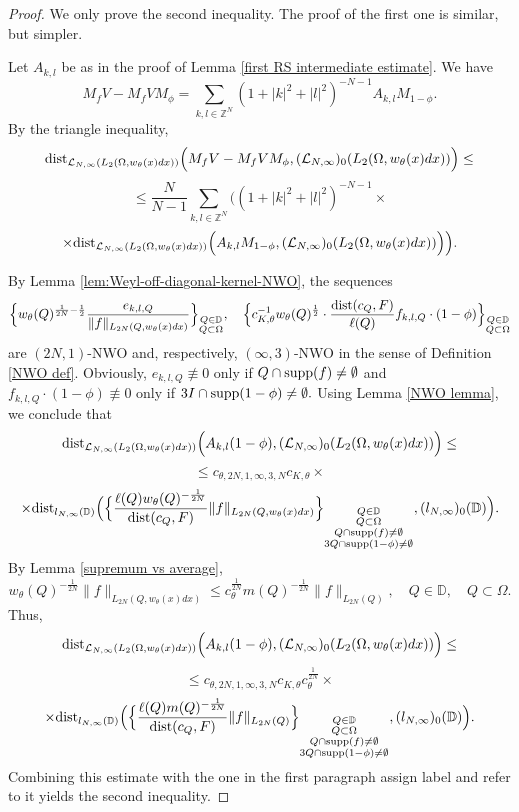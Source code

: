 \documentclass{amsart}
\begin{document}
\begin{proof} We only prove the second inequality. The proof of the first one is similar, but simpler.

Let $A_{k,l}$ be as in the proof of Lemma \ref{first RS intermediate estimate}. We have
$$M_fV-M_fVM_{\phi}=\sum_{k,l\in\mathbb{Z}^N}(1+|k|^2+|l|^2)^{-N-1}A_{k,l}M_{1-\phi}.$$
By the triangle inequality,
$${\rm dist}_{\mathcal{L}_{N,\infty}(L_2(\Omega,w_{\theta}(x)dx))}\Big(M_fV-M_fVM_{\phi},(\mathcal{L}_{N,\infty})_0(L_2(\Omega,w_{\theta}(x)dx))\Big)\leq$$
$$\leq \frac{N}{N-1}\sum_{k,l\in\mathbb{Z}^N}\Big((1+|k|^2+|l|^2)^{-N-1}\times$$
$$\times{\rm dist}_{\mathcal{L}_{N,\infty}(L_2(\Omega,w_{\theta}(x)dx))}\Big(A_{k,l}M_{1-\phi},(\mathcal{L}_{N,\infty})_0(L_2(\Omega,w_{\theta}(x)dx))\Big)\Big).$$

By Lemma \ref{lem:Weyl-off-diagonal-kernel-NWO}, the sequences
$$\Big\{w_{\theta}(Q)^{\frac1{2N}-\frac12}\frac{e_{k,l,Q}}{\|f\|_{L_{2N}(Q,w_{\theta}(x)dx)}}\Big\}_{\substack{Q\in\mathbb{D}\\ Q\subset\Omega}},\quad \Big\{c_{K,\theta}^{-1}w_{\theta}(Q)^{\frac12}\cdot\frac{{\rm dist}(c_Q,F)}{\ell(Q)}f_{k,l,Q}\cdot(1-\phi)\Big\}_{\substack{Q\in\mathbb{D}\\ Q\subset\Omega}}$$
are $(2N,1)$-NWO and, respectively, $(\infty,3)$-NWO in the sense of Definition \ref{NWO def}. Obviously, $e_{k,l,Q}\not\equiv0$ only if $Q\cap {\rm supp}(f)\neq\emptyset$ and $f_{k,l,Q}\cdot(1-\phi)\not\equiv 0$ only if $3I\cap {\rm supp}(1-\phi)\neq\emptyset.$ Using Lemma \ref{NWO lemma}, we conclude that
$${\rm dist}_{\mathcal{L}_{N,\infty}(L_2(\Omega,w_{\theta}(x)dx))}\Big(A_{k,l}(1-\phi),(\mathcal{L}_{N,\infty})_0(L_2(\Omega,w_{\theta}(x)dx))\Big)\leq$$
$$\leq c_{\theta,2N,1,\infty,3,N}c_{K,\theta}\times$$
$$\times{\rm dist}_{l_{N,\infty}(\mathbb{D})}\Big(\Big\{\frac{\ell(Q)w_{\theta}(Q)^{-\frac1{2N}}}{{\rm dist}(c_Q,F)}\|f\|_{L_{2N}(Q,w_{\theta}(x)dx)}\Big\}_{\substack{Q\in\mathbb{D}\\ Q\subset\Omega\\ Q\cap {\rm supp}(f)\neq\emptyset\\ 3Q\cap {\rm supp}(1-\phi)\neq\emptyset}},(l_{N,\infty})_0(\mathbb{D})\Big).$$
By Lemma \ref{supremum vs average},
$$w_{\theta}(Q)^{-\frac1{2N}}\|f\|_{L_{2N}(Q,w_{\theta}(x)dx)}\leq c_{\theta}^{\frac1{2N}}m(Q)^{-\frac1{2N}}\|f\|_{L_{2N}(Q)},\quad Q\in\mathbb{D},\quad Q\subset\Omega.$$
Thus,
$${\rm dist}_{\mathcal{L}_{N,\infty}(L_2(\Omega,w_{\theta}(x)dx))}\Big(A_{k,l}(1-\phi),(\mathcal{L}_{N,\infty})_0(L_2(\Omega,w_{\theta}(x)dx))\Big)\leq$$
$$\leq c_{\theta,2N,1,\infty,3,N}c_{K,\theta}c_{\theta}^{\frac1{2N}}\times$$
$$\times{\rm dist}_{l_{N,\infty}(\mathbb{D})}\Big(\Big\{\frac{\ell(Q)m(Q)^{-\frac1{2N}}}{{\rm dist}(c_Q,F)}\|f\|_{L_{2N}(Q)}\Big\}_{\substack{Q\in\mathbb{D}\\ Q\subset\Omega\\ Q\cap {\rm supp}(f)\neq\emptyset\\ 3Q\cap {\rm supp}(1-\phi)\neq\emptyset}},(l_{N,\infty})_0(\mathbb{D})\Big).$$
Combining this estimate with the one in the first paragraph {\color{red} assign label and refer to it} yields the second inequality.
\end{proof}
\end{document}
